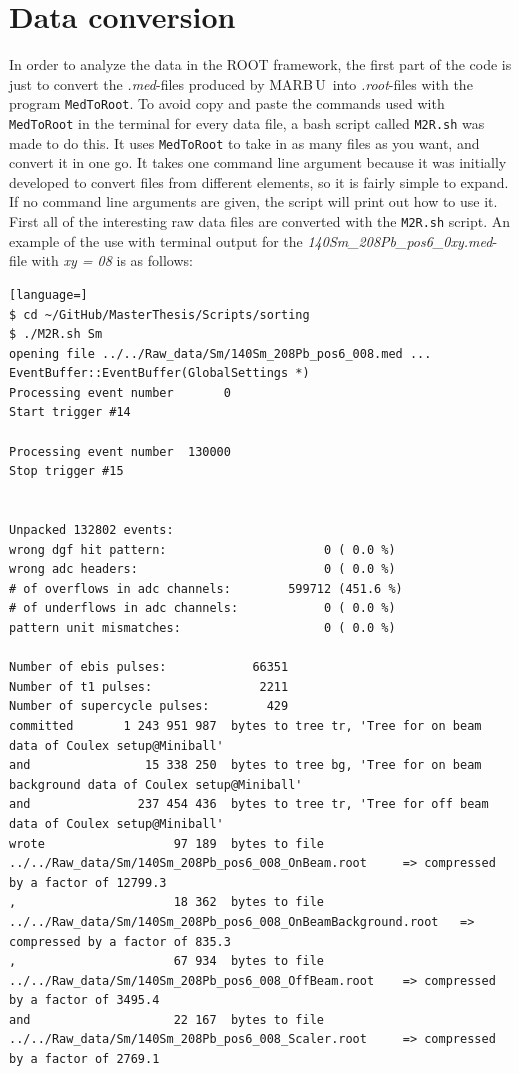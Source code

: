 \documentclass[twoside,english]{uiofysmaster/uiofysmaster}
\newcommand{\MBOU}{MAR\belowbaseline[-2pt]{a}B\stackinset{l}{3pt}{b}{-3pt}{O}{O}\,U}
\begin{document}
\section{Data conversion}
In order to analyze the data in the ROOT framework, the first part of the code is just to convert the \textit{.med}-files produced by \MBOU\ into \textit{.root}-files with the program \texttt{MedToRoot}. 
To avoid copy and paste the commands used with \texttt{MedToRoot} in the terminal for every data file, a bash script called \texttt{M2R.sh} was made to do this. 
It uses \texttt{MedToRoot} to take in as many files as you want, and convert it in one go. 
It takes one command line argument because it was initially developed to convert files from different elements, so it is fairly simple to expand. 
If no command line arguments are given, the script will print out how to use it.
First all of the interesting raw data files are converted with the \texttt{M2R.sh} script. 
An example of the use with terminal output for the \textit{140Sm\_208Pb\_pos6\_0xy.med}-file with \textit{xy = 08} is as follows:

\begin{lstlisting}[language=]
$ cd ~/GitHub/MasterThesis/Scripts/sorting
$ ./M2R.sh Sm
opening file ../../Raw_data/Sm/140Sm_208Pb_pos6_008.med ...
EventBuffer::EventBuffer(GlobalSettings *)
Processing event number       0
Start trigger #14

Processing event number  130000
Stop trigger #15


Unpacked 132802 events:
wrong dgf hit pattern:                      0 ( 0.0 %)
wrong adc headers:                          0 ( 0.0 %)
# of overflows in adc channels:        599712 (451.6 %)
# of underflows in adc channels:            0 ( 0.0 %)
pattern unit mismatches:                    0 ( 0.0 %)

Number of ebis pulses:            66351
Number of t1 pulses:               2211
Number of supercycle pulses:        429
committed       1 243 951 987  bytes to tree tr, 'Tree for on beam data of Coulex setup@Miniball'
and                15 338 250  bytes to tree bg, 'Tree for on beam background data of Coulex setup@Miniball'
and               237 454 436  bytes to tree tr, 'Tree for off beam data of Coulex setup@Miniball'
wrote                  97 189  bytes to file ../../Raw_data/Sm/140Sm_208Pb_pos6_008_OnBeam.root 	=> compressed by a factor of 12799.3
,                      18 362  bytes to file ../../Raw_data/Sm/140Sm_208Pb_pos6_008_OnBeamBackground.root 	=> compressed by a factor of 835.3
,                      67 934  bytes to file ../../Raw_data/Sm/140Sm_208Pb_pos6_008_OffBeam.root 	=> compressed by a factor of 3495.4
and                    22 167  bytes to file ../../Raw_data/Sm/140Sm_208Pb_pos6_008_Scaler.root 	=> compressed by a factor of 2769.1
\end{lstlisting}
\end{document}
